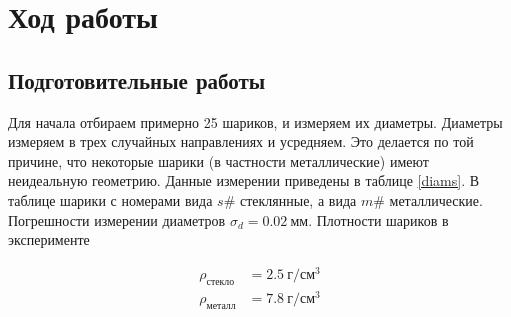 \documentclass[a4paper, 12pt]{article}
\begin{document}
\section{Ход работы} \subsection{Подготовительные работы} Для начала отбираем
примерно 25 шариков, и измеряем их диаметры. Диаметры измеряем в трех случайных
направлениях и усредняем. Это делается по той причине, что некоторые шарики (в
частности металлические) имеют неидеальную геометрию. Данные измерении приведены
в таблице \ref{diams}. В таблице шарики с номерами вида $s\#$ стеклянные, а вида
$m\#$ металлические. Погрешности измерении диаметров $\sigma_d = 0.02\ \text{мм}$.
Плотности шариков в эксперименте

\begin{align*} \rho_{стекло} & =2.5\ \text{г}/\text{см}^3 \\ \rho_{металл} & =7.8\ \text{г}/\text{см}^3
\end{align*}
\end{document}
